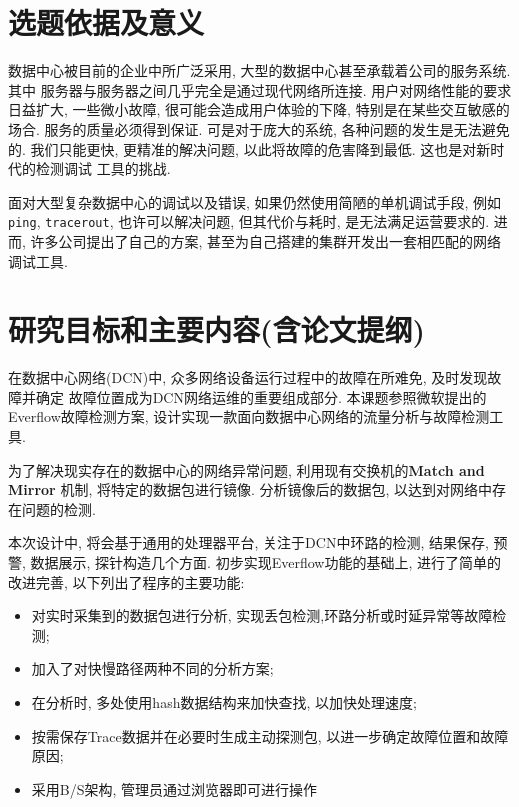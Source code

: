 
\chapter{选题依据及意义}

数据中心被目前的企业中所广泛采用,
大型的数据中心甚至承载着公司的服务系统. 其中
服务器与服务器之间几乎完全是通过现代网络所连接.
用户对网络性能的要求日益扩大, 一些微小故障, 很可能会造成用户体验的下降,
特别是在某些交互敏感的场合. 服务的质量必须得到保证. 可是对于庞大的系统,
各种问题的发生是无法避免的. 我们只能更快, 更精准的解决问题,
以此将故障的危害降到最低. 这也是对新时代的检测调试 工具的挑战.

面对大型复杂数据中心的调试以及错误, 如果仍然使用简陋的单机调试手段,
例如\texttt{ping}, \texttt{tracerout}, 也许可以解决问题, 但其代价与耗时,
是无法满足运营要求的. 进而, 许多公司提出了自己的方案,
甚至为自己搭建的集群开发出一套相匹配的网络调试工具.



\chapter{研究目标和主要内容(含论文提纲)}

在数据中心网络(DCN)中, 众多网络设备运行过程中的故障在所难免,
及时发现故障并确定 故障位置成为DCN网络运维的重要组成部分.
本课题参照微软提出的Everflow故障检测方案,
设计实现一款面向数据中心网络的流量分析与故障检测工具.

为了解决现实存在的数据中心的网络异常问题, 利用现有交换机的\textbf{Match and Mirror}
机制, 将特定的数据包进行镜像. 分析镜像后的数据包, 以达到对网络中存在问题的检测.

本次设计中, 将会基于通用的处理器平台, 关注于DCN中环路的检测, 结果保存,
预警, 数据展示, 探针构造几个方面. 初步实现Everflow功能的基础上,
进行了简单的改进完善, 以下列出了程序的主要功能:

\begin{itemize}
\item
  对实时采集到的数据包进行分析,
  实现丢包检测,环路分析或时延异常等故障检测;
\item
  加入了对快慢路径两种不同的分析方案;
\item
  在分析时, 多处使用hash数据结构来加快查找, 以加快处理速度;
\item
  按需保存Trace数据并在必要时生成主动探测包,
  以进一步确定故障位置和故障原因;
\item
  采用B/S架构, 管理员通过浏览器即可进行操作
\end{itemize}

